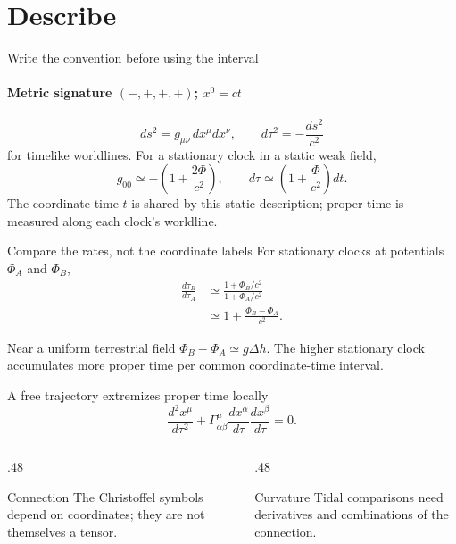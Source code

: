 \documentclass[11pt,aspectratio=169]{beamer}
\begin{document}
\section{Describe}
\begin{frame}{Write the convention before using the interval}
\framesubtitle{Metric signature $(-,+,+,+)$; $x^0=ct$}
\[
 ds^2=g_{\mu\nu}\,dx^\mu dx^\nu,\qquad d\tau^2=-\frac{ds^2}{c^2}
\]
for timelike worldlines.
\medskip
For a stationary clock in a static weak field,
\[
 g_{00}\simeq-\left(1+\frac{2\Phi}{c^2}\right),
 \qquad d\tau\simeq\left(1+\frac{\Phi}{c^2}\right)dt.
\]
The coordinate time $t$ is shared by this static description; proper time is measured along each clock's worldline.
\end{frame}
\begin{frame}{Compare the rates, not the coordinate labels}
For stationary clocks at potentials $\Phi_A$ and $\Phi_B$,
\begin{align*}
 \frac{d\tau_B}{d\tau_A}
 &\simeq\frac{1+\Phi_B/c^2}{1+\Phi_A/c^2}\\
 &\simeq1+\frac{\Phi_B-\Phi_A}{c^2}.
\end{align*}
\pause
\begin{exampleblock}{Near a uniform terrestrial field}
$\Phi_B-\Phi_A\simeq g\Delta h$. The higher stationary clock accumulates more proper time per common coordinate-time interval.
\end{exampleblock}
\end{frame}
\begin{frame}{A free trajectory extremizes proper time locally}
\[
 \frac{d^2x^\mu}{d\tau^2}
 +\Gamma^\mu_{\alpha\beta}
 \frac{dx^\alpha}{d\tau}\frac{dx^\beta}{d\tau}=0.
\]
\begin{columns}[T]
\begin{column}{.48\textwidth}\begin{block}{Connection}
The Christoffel symbols depend on coordinates; they are not themselves a tensor.
\end{block}\end{column}
\begin{column}{.48\textwidth}\begin{block}{Curvature}
Tidal comparisons need derivatives and combinations of the connection.
\end{block}\end{column}
\end{columns}
\end{frame}
\end{document}
